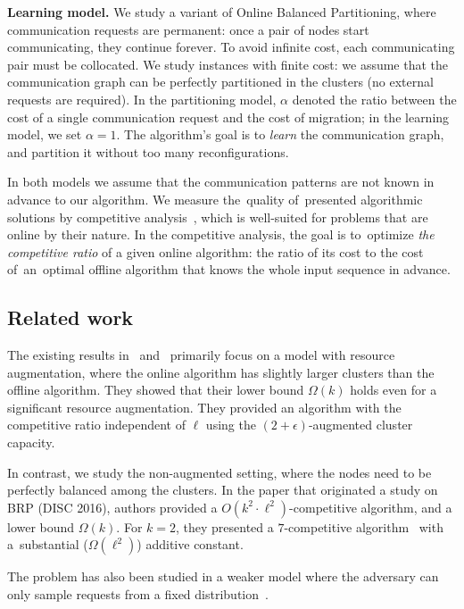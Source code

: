 \documentclass[manuscript,screen=true, review, anonymous]{acmart}
\begin{document}
\noindent
\textbf{Learning model.}
We study a variant of Online Balanced Partitioning, where communication requests are permanent: once a pair of nodes start communicating, they continue forever.
To avoid infinite cost, each communicating pair must be collocated.
We study instances with finite cost: we assume that the communication graph can be perfectly partitioned in the clusters (no external requests are required).
In the partitioning model, $\alpha$ denoted the ratio between the cost of a single communication request and the cost of migration; in the learning model, we set $\alpha = 1$.
The algorithm's goal is to \emph{learn} the communication graph, and partition it without too many reconfigurations.


\medskip 
In both models we assume that the communication patterns are not known in advance to our algorithm.
We measure the~quality of~presented algorithmic solutions by competitive analysis~\cite{borodin-book}, which is well-suited for problems that are online by their nature.
In the competitive analysis, the goal is to~optimize \emph{the competitive ratio} of a given online algorithm: the ratio of its cost to the cost of~an~optimal offline algorithm that knows the whole input sequence in advance.





\subsection{Related work}


The existing results in~\cite{repartition-disc} and~\cite{sigmetrics19_partitioning} primarily focus on a model with resource augmentation, where  the online algorithm has slightly larger clusters than the offline algorithm.
They showed that their lower bound $\Omega(k)$ holds even for a significant resource augmentation.
They provided an algorithm with the competitive ratio independent of $\ell$ using the $(2+\epsilon)$-augmented cluster capacity.


In contrast, we study the non-augmented setting, where the nodes need to be perfectly balanced  among the clusters.
In the paper that originated a study on BRP \cite{repartition-disc} (DISC 2016), authors provided a $O(k^2 \cdot \ell^2)$-competitive algorithm, and a lower bound $\Omega(k)$.
For $k=2$, they presented a $7$-competitive algorithm~\cite{repartition-disc} with a~substantial ($\Omega(\ell^2)$) additive constant.


The problem has also been studied in a weaker
model where the adversary can only sample
requests from a fixed distribution~\cite{stochastic-ring}.
\end{document}
